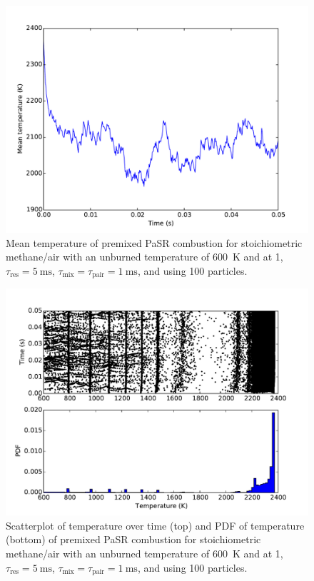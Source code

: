 \documentclass[preprint,12pt]{elsarticle}
\begin{document}
{\begin{figure}[tbp]
\centering
\includegraphics[width=.75\textwidth]{CH4_600K_1atm_mean_temperature.pdf}
\caption{Mean temperature of premixed PaSR combustion for stoichiometric methane\slash air with an unburned temperature of \SI{600}{\kelvin} and at \SI{1}{\atm}, $\tau_{\text{res}} = \SI{5}{\milli\second}$, $\tau_{\text{mix}} = \tau_{\text{pair}} = \SI{1}{\milli\second}$, and using 100 particles.}
\label{F:ch4_meantemp}
\end{figure}

\begin{figure}[tbp]
\centering
\includegraphics[width=.75\textwidth]{CH4_600K_1atm_particle_temperature.pdf}
\caption{Scatterplot of temperature over time (top) and PDF of temperature (bottom) of premixed PaSR combustion for stoichiometric methane\slash air with an unburned temperature of \SI{600}{\kelvin} and at \SI{1}{\atm}, $\tau_{\text{res}} = \SI{5}{\milli\second}$, $\tau_{\text{mix}} = \tau_{\text{pair}} = \SI{1}{\milli\second}$, and using 100 particles.}
\label{F:ch4_particle_temp}
\end{figure}

}
\end{document}
